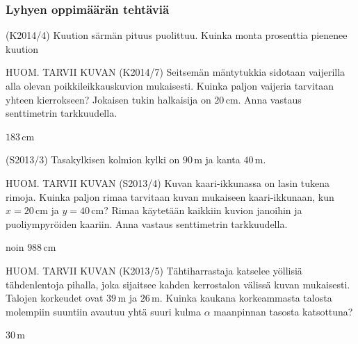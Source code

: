 
\subsubsection*{Lyhyen oppimäärän tehtäviä}

\begin{tehtava}
	(K2014/4) Kuution särmän pituus puolittuu. Kuinka monta prosenttia pienenee kuution
						
						\begin{vastaus}
	\end{vastaus}
	\end{tehtava}

\begin{tehtava}
HUOM. TARVII KUVAN 
(K2014/7) Seitsemän mäntytukkia sidotaan vaijerilla alla olevan poikkileikkauskuvion mukaisesti. Kuinka paljon vaijeria tarvitaan yhteen kierrokseen? Jokaisen tukin halkaisija on $20$\,cm.
Anna vastaus senttimetrin tarkkuudella. 
  \begin{vastaus}
  $183$\,cm
  \end{vastaus}
\end{tehtava}

\begin{tehtava}(S2013/3) Tasakylkisen kolmion kylki on $90$\,m ja kanta $40$\,m.
    \begin{vastaus}
 \end{vastaus}
\end{tehtava}

\begin{tehtava}
HUOM. TARVII KUVAN 
(S2013/4) Kuvan kaari-ikkunassa on lasin tukena rimoja. Kuinka paljon rimaa tarvitaan kuvan mukaiseen kaari-ikkunaan, kun $x=20$\,cm ja $y=40$\,cm? Rimaa käytetään kaikkiin kuvion janoihin ja puoliympyröiden kaariin. Anna vastaus senttimetrin tarkkuudella.
  \begin{vastaus}
  noin $988$\,cm
  \end{vastaus}
\end{tehtava}

\begin{tehtava}
HUOM. TARVII KUVAN 
(K2013/5) Tähtiharrastaja katselee yöllisiä tähdenlentoja pihalla, joka sijaitsee kahden kerrostalon välissä kuvan mukaisesti. Talojen korkeudet ovat $39$\,m ja $26$\,m. Kuinka kaukana korkeammasta talosta molempiin suuntiin avautuu yhtä suuri kulma $\alpha$ maanpinnan tasosta katsottuna? 
  \begin{vastaus}
  $30$\,m
  \end{vastaus}
\end{tehtava}

